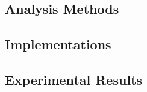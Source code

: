 
\subsection{Analysis Methods}
\label{sec:bijAnalysisDesc}


\subsection{\CC Implementations}
\label{sec:implementation}


\subsection{Experimental Results}
\label{sec:exp}
